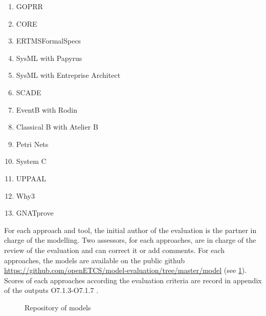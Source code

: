 \begin{enumerate}

\item  GOPRR
\item  CORE
\item  ERTMSFormalSpecs
\item  SysML with Papyrus
\item  SysML with Entreprise Architect
\item  SCADE
\item  EventB with Rodin
\item  Classical B with Atelier B
\item  Petri Nets
\item  System C
\item  UPPAAL
\item  Why3
\item  GNATprove

\end{enumerate}

For each approach and tool, the initial  author of the evaluation is the partner in charge of the modelling. Two assessors, for each approaches,  are in charge of the review of the evaluation and can correct it or add comments. For each approaches, the models are available on the public github \url{https://github.com/openETCS/model-evaluation/tree/master/model} (see \ref{fig:models}).
Scores of each approaches according the evaluation criteria are record in appendix of the outputs O7.1.3-O7.1.7 \citep{WP7_O713_O717}.


 \begin{figure}
  \centering
  \caption{Repository of models}
  \label{fig:models}
\end{figure}


